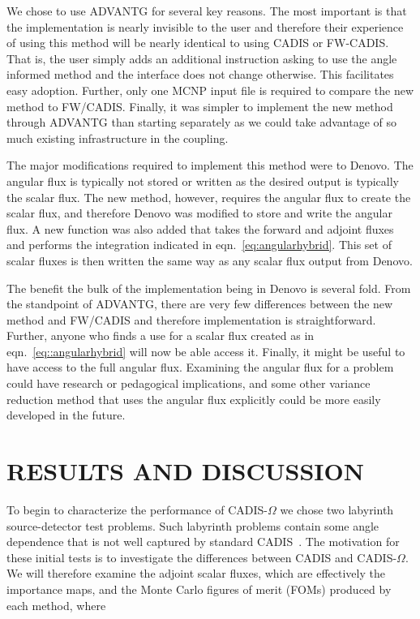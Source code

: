 \documentclass[12pt]{article}
\begin{document}
We chose to use ADVANTG for several key reasons. 
The most important is that the implementation is nearly invisible to the user and therefore their experience of using this method will be nearly identical to using CADIS or FW-CADIS.
That is, the user simply adds an additional instruction asking to use the angle informed method and the interface does not change otherwise.
This facilitates easy adoption.
Further, only one MCNP input file is required to compare the new method to FW/CADIS.
Finally, it was simpler to implement the new method through ADVANTG than starting separately as we could take advantage of so much existing infrastructure in the coupling.

The major modifications required to implement this method were to Denovo. 
The angular flux is typically not stored or written as the desired output is typically the scalar flux.
The new method, however, requires the angular flux to create the scalar flux, and therefore Denovo was modified to store and write the angular flux.
A new function was also added that takes the forward and adjoint fluxes and performs the integration indicated in eqn.~\eqref{eq:angularhybrid}. 
This set of scalar fluxes is then written the same way as any scalar flux output from Denovo.

The benefit the bulk of the implementation being in Denovo is several fold. 
From the standpoint of ADVANTG, there are very few differences between the new method and FW/CADIS and therefore implementation is straightforward.
Further, anyone who finds a use for a scalar flux created as in eqn.~\eqref{eq::angularhybrid} will now be able  access it.
Finally, it might be useful to have access to the full angular flux. 
Examining the angular flux for a problem could have research or pedagogical implications, and some other variance reduction method that uses the angular flux explicitly could be more easily developed in the future.

%
\section{RESULTS AND DISCUSSION} 
\label{sect::results}

To begin to characterize the performance of CADIS-$\Omega$ we chose two labyrinth source-detector test problems.
Such labyrinth problems contain some angle dependence that is not well captured by standard CADIS~\cite{Peplow-ORNL}. 
The motivation for these initial tests is to investigate the differences between CADIS and CADIS-$\Omega$.
We will therefore examine the adjoint scalar fluxes, which are effectively the importance maps, and the Monte Carlo figures of merit (FOMs) produced by each method, where 
\end{document}
